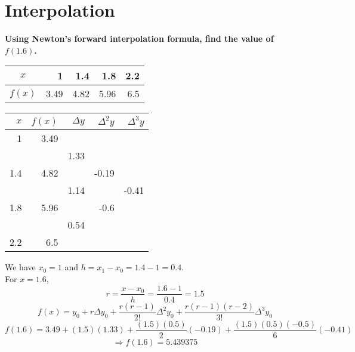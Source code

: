 \documentclass[]{book}
\begin{document}
\chapter{Interpolation}
\textbf{Using  Newton's  forward  interpolation  formula,  find  the  value  of $f(1.6)$.}
\begin{center}
\begin{tabular}{|c|r|r|r|r|}
\hline
$x$ & 1 & 1.4 & 1.8 & 2.2\\
\hline
$f(x)$ & 3.49 & 4.82 & 5.96 & 6.5\\
\hline
\end{tabular}
\end{center}
\begin{center}
\begin{tabular}{r|rrrr}
$x$ & $f(x)$ & $\Delta y$ & ${\Delta}^{2} y$ & ${\Delta}^{3} y$\\
\hline
1 & 3.49 & & & \\
& & 1.33 & &\\
1.4 & 4.82 & & -0.19 &\\
& & 1.14 & & -0.41\\
1.8 & 5.96 & & -0.6 &\\
& & 0.54 & &\\
2.2 & 6.5 & & &\\
\end{tabular}
\end{center}
We have $x_{0} = 1$ and $h = x_{1}-x_{0} = 1.4 - 1 = 0.4$.\\
For $x = 1.6$, $$r=\dfrac{x-x_{0}}{h}=\dfrac{1.6-1}{0.4} = 1.5$$
$$f(x) = y_{0} + r\Delta y_{0}+\frac{r(r-1)}{2!}{\Delta}^{2}y_{0}+\frac{r(r-1)(r-2)}{3!}{\Delta}^{3}y_{0}$$
$$f(1.6) = 3.49+(1.5)(1.33)+\frac{(1.5)(0.5)}{2}(-0.19)+\frac{(1.5)(0.5)(-0.5)}{6}(-0.41)$$
$$\Rightarrow \boxed{f(1.6) = 5.439375}$$
\end{document}
